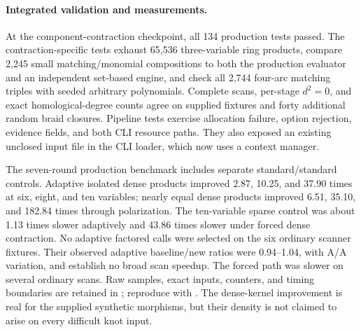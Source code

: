 \paragraph{Integrated validation and measurements.}
At the component-contraction checkpoint, all 134 production tests passed. The contraction-specific tests exhaust
65,536 three-variable ring products, compare 2,245 small matching/monomial
compositions to both the production evaluator and an independent set-based
engine, and check all 2,744 four-arc matching triples with seeded arbitrary
polynomials. Complete scans, per-stage $d^2=0$, and exact homological-degree
counts agree on supplied fixtures and forty additional random braid closures.
Pipeline tests exercise allocation failure, option rejection, evidence fields,
and both CLI resource paths. They also exposed an existing unclosed input
file in the CLI loader, which now uses a context manager.

The seven-round production benchmark includes separate standard/standard
controls. Adaptive isolated dense products improved 2.87, 10.25, and 37.90
times at six, eight, and ten variables; nearly equal dense products improved
6.51, 35.10, and 182.84 times through polarization. The ten-variable sparse
control was about 1.13 times slower adaptively and 43.86 times slower under
forced dense contraction. No adaptive factored calls were selected on the
six ordinary scanner fixtures. Their observed adaptive baseline/new ratios
were 0.94--1.04, with A/A variation, and establish no broad scan speedup.
The forced path was slower on several ordinary scans. Raw samples, exact
inputs, counters, and timing boundaries are retained in
; reproduce with
. The dense-kernel improvement
is real for the supplied synthetic morphisms, but their density is not
claimed to arise on every difficult knot input.
